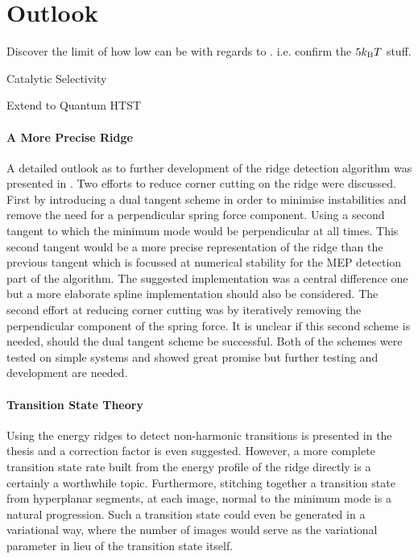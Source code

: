 \section{Outlook}
\label{sec:summary-outlook}

\bit
\item Discover the limit of how low  can be with regards to . i.e. confirm the $5k_\text{B} T$ stuff.
\item Catalytic Selectivity
\item Extend to Quantum HTST
\eit

\paragraph{A More Precise Ridge}
A detailed outlook as to further development of the ridge detection algorithm was presented in .
Two efforts to reduce corner cutting on the ridge were discussed.
First by introducing a dual tangent scheme in order to minimise instabilities and remove the need for a perpendicular spring force component.
Using a second tangent to which the minimum mode would be perpendicular at all times.
This second tangent would be a more precise representation of the ridge than the previous tangent which is focussed at numerical stability for the MEP detection part of the algorithm.
The suggested implementation was a central difference one but a more elaborate spline implementation should also be considered.
The second effort at reducing corner cutting was by iteratively removing the perpendicular component of the spring force.
It is unclear if this second scheme is needed, should the dual tangent scheme be successful.
Both of the schemes were tested on simple systems and showed great promise but further testing and development are needed.

\paragraph{Transition State Theory}
Using the energy ridges to detect non-harmonic transitions is presented in the thesis and a correction factor is even suggested.
However, a more complete transition state rate built from the energy profile of the ridge directly is a certainly a worthwhile topic.
Furthermore, stitching together a transition state from hyperplanar segments, at each image, normal to the minimum mode is a natural progression.
Such a transition state could even be generated in a variational way, where the number of images would serve as the variational parameter in lieu of the transition state itself.

